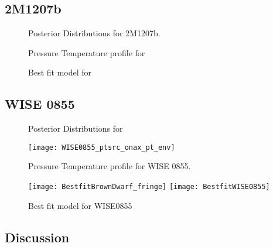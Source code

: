 \subsection{2M1207b}
\begin{figure}[h]
	\caption{Posterior Distributions for 2M1207b.}
	\label{fig:post2M}
\end{figure}
\begin{figure}[h]
	\caption{Pressure Temperature profile for}
	\label{fig:pres2M}
\end{figure}
\begin{figure}[h]
	\caption{Best fit model for}
	\label{fig:bestfit2M}
\end{figure}

\subsection{WISE 0855}
\begin{figure}[h]
	\caption{Posterior Distributions for}
	\label{fig:postWISE}
\end{figure}
\begin{figure}[h]
	\texttt{[image: WISE0855\_ptsrc\_onax\_pt\_env]}
	\caption{Pressure Temperature profile for WISE 0855.}
	\label{fig:presWISE}
\end{figure}
\begin{figure}[h]
	\texttt{[image: BestfitBrownDwarf\_fringe]}
	\texttt{[image: BestfitWISE0855]}
	\caption{Best fit model for WISE0855}
	\label{fig:bestfitWISE}
\end{figure}
\subsection{Discussion}

